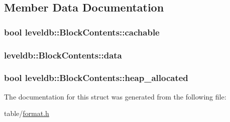 \subsection{Member Data Documentation}
\hypertarget{structleveldb_1_1_block_contents_ad9cbcf81fb1378ce5f9a0db2e8d4b539}{
\subsubsection[{cachable}]{\setlength{\rightskip}{0pt plus 5cm}bool leveldb\-::\-Block\-Contents\-::cachable}}\label{structleveldb_1_1_block_contents_ad9cbcf81fb1378ce5f9a0db2e8d4b539}
\hypertarget{structleveldb_1_1_block_contents_aa30fe6388fe0f89d5565f6bae788c28e}{
\subsubsection[{data}]{ leveldb\-::\-Block\-Contents\-::data}}\label{structleveldb_1_1_block_contents_aa30fe6388fe0f89d5565f6bae788c28e}
\hypertarget{structleveldb_1_1_block_contents_a0d4390fa3d4041ac5a3da51cbb16e315}{
\subsubsection[{heap\-\_\-allocated}]{\setlength{\rightskip}{0pt plus 5cm}bool leveldb\-::\-Block\-Contents\-::heap\-\_\-allocated}}\label{structleveldb_1_1_block_contents_a0d4390fa3d4041ac5a3da51cbb16e315}


The documentation for this struct was generated from the following file\-:\begin{DoxyCompactItemize}
\item 
table/\hyperlink{format_8h}{format.\-h}\end{DoxyCompactItemize}

